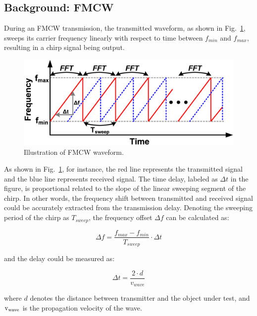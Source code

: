 %
%

\subsection{Background: FMCW}
\label{sec:fmcw}
During an FMCW transmission, the transmitted waveform, as shown in Fig.~\ref{fig:fmcw}, sweeps its carrier frequency linearly with respect to time between $f_{min}$ and $f_{max}$, resulting in a chirp signal being output. 

%
\begin{figure}[!htbp]
	\centering
	\includegraphics[width=0.9\columnwidth]{Fig01_fmcw}
	\captionsetup{justification=raggedright, singlelinecheck=false}
	\caption{Illustration of FMCW waveform.}
	\label{fig:fmcw}
\end{figure}
%

As shown in Fig.~\ref{fig:fmcw}, for instance, the red line represents the transmitted signal and the blue line represents received signal. The time delay, labeled as $\Delta t$ in the figure, is proportional related to the slope of the linear sweeping segment of the chirp. In other words, the frequency shift between transmitted and received signal could be accurately extracted from the transmission delay. Denoting the sweeping period of the chirp as $T_{sweep}$, the frequency offset $\Delta f$ can be calculated as:

%
\begin{equation}
	\label{eqn:fmcw_df}
	\Delta f = \dfrac{f_{max} - f_{min}}{T_{sweep}} \cdot \Delta t
\end{equation}
%

and the delay could be measured as:

%
\begin{equation}
	\label{eqn:fmcw_dt}
	\Delta t = \dfrac{2 \cdot d}{v_{wave}}
\end{equation}
%

where $d$ denotes the distance between transmitter and the object under test, and $\rm v_{wave}$ is the propagation velocity of the wave.

